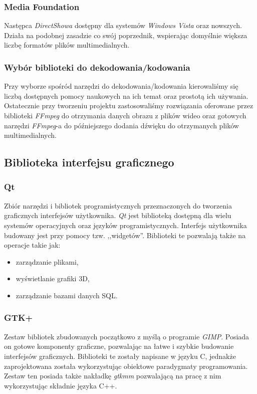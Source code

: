 \documentclass[twoside]{projektInzynierskiMS}
\begin{document}
\subsubsection{Media Foundation}
Następca \emph{DirectShowa} dostępny dla systemów \emph{Windows Vista} oraz nowszych. Działa na podobnej zasadzie co swój poprzednik, wspierając domyślnie większa liczbę formatów plików multimedialnych.
\subsubsection{Wybór biblioteki do dekodowania/kodowania}
Przy wyborze spośród narzędzi do dekodowania/kodowania kierowaliśmy się liczbą dostępnych pomocy naukowych na ich temat oraz prostotą ich używania. Ostatecznie przy tworzeniu projektu zastosowaliśmy rozwiązania oferowane przez biblioteki \emph{FFmpeg} do otrzymania danych obrazu z plików wideo oraz gotowych narzędzi \emph{FFmpeg}-a do późniejszego dodania dźwięku do otrzymanych plików multimedialnych.

\subsection{Biblioteka interfejsu graficznego}

\subsubsection{Qt}
Zbiór narzędzi i bibliotek programistycznych przeznaczonych do tworzenia graficznych interfejsów użytkownika. \emph{Qt} jest biblioteką dostępną dla wielu systemów operacyjnych oraz języków programistycznych. Interfejs użytkownika budowany jest przy pomocy tzw. ,,widgetów''. Biblioteki te pozwalają także na operacje takie jak: 
\begin{itemize}
	\item zarządzanie plikami,
	\item wyświetlanie grafiki 3D,
	\item zarządzanie bazami danych SQL.
\end{itemize}
\subsubsection{GTK+}
Zestaw bibliotek zbudowanych początkowo z myślą o programie \emph{GIMP}. Posiada on gotowe komponenty graficzne, pozwalając na łatwe i szybkie budowanie interfejsów graficznych. Biblioteki te zostały napisane w języku C, jednakże zaprojektowana została wykorzystując obiektowe paradygmaty programowania. Zestaw ten posiada także nakładkę \emph{gtkmm} pozwalającą na pracę z nim wykorzystując składnie języka C++.
\end{document}
